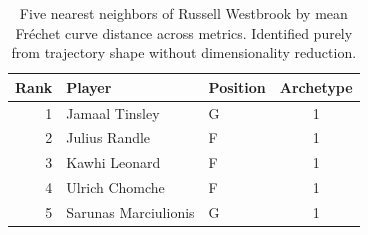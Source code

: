 \begin{table}[htbp]
  \centering\small
  \begin{tabular}{rllc}
    \toprule
    Rank & Player & Position & Archetype \\
    \midrule
    1 & Jamaal Tinsley & G & 1 \\
    2 & Julius Randle & F & 1 \\
    3 & Kawhi Leonard & F & 1 \\
    4 & Ulrich Chomche & F & 1 \\
    5 & Sarunas Marciulionis & G & 1 \\
    \bottomrule
  \end{tabular}
  \caption{Five nearest neighbors of Russell Westbrook by mean Fr\'{e}chet curve distance across metrics. Identified purely from trajectory shape without dimensionality reduction.}
  \label{tab:Russell_Westbrook_frechet_curve_neighbors}
\end{table}

